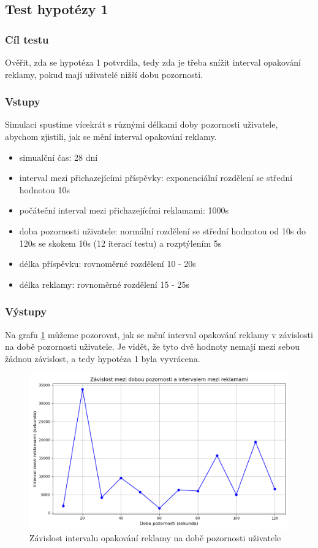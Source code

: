 \documentclass[11pt, a4paper]{article}
\begin{document}
\subsection{Test hypotézy 1}

\subsubsection{Cíl testu}
Ověřit, zda se hypotéza 1 potvrdila, tedy zda je třeba snížit interval opakování reklamy, pokud mají uživatelé nižší dobu pozornosti.
\subsubsection{Vstupy}
Simulaci spustíme vícekrát s různými délkami doby pozornosti uživatele, abychom zjistili, jak se mění interval opakování reklamy.
\begin{itemize}
    \item simualční čas: 28 dní
    \item interval mezi přichazejícími příspěvky: exponenciální rozdělení se střední hodnotou 10s
    \item počáteční interval mezi přichazejícími reklamami: 1000s
    \item doba pozornosti uživatele: normální rozdělení se střední hodnotou od 10s do 120s se skokem 10s (12 iterací testu) a rozptýlením 5s
    \item délka příspěvku: rovnoměrné rozdělení 10 - 20s
    \item délka reklamy: rovnoměrné rozdělení 15 - 25s
\end{itemize}

\subsubsection{Výstupy}

Na grafu \ref{fig:attention_time_vs_ad_interval} můžeme pozorovat, jak se mění interval opakování reklamy v závislosti na době pozornosti uživatele.
Je vidět, že tyto dvě hodnoty nemají mezi sebou žádnou závislost, a tedy hypotéza 1 byla vyvrácena.
\begin{figure}[h]
    \centering
    \includegraphics[width=\linewidth]{attention_time_vs_ad_interval.png}
    \caption{Závislost intervalu opakování reklamy na době pozornosti uživatele}
    \label{fig:attention_time_vs_ad_interval}
\end{figure}
\end{document}
